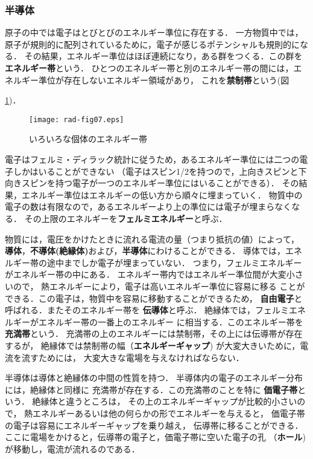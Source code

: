 \documentclass[a4j,10pt,oneside,openany]{jsbook}
\begin{document}
\subsubsection{半導体}

原子の中では電子はとびとびのエネルギー準位に存在する．
一方物質中では，原子が規則的に配列されているために，電子が感じるポテンシャルも規則的になる．
その結果，エネルギー準位はほぼ連続になり，ある群をつくる．この群を{\bf エネルギー帯}という．
ひとつのエネルギー帯と別のエネルギー帯の間には，エネルギー準位が存在しないエネルギー領域があり，
これを{\bf 禁制帯}という(図{\ref{fig:rad-fig07})．

\begin{figure}[h]
  \begin{center}
    \texttt{[image: rad-fig07.eps]}
    \caption{いろいろな個体のエネルギー帯}
    \label{fig:rad-fig07}
  \end{center}
\end{figure}


電子はフェルミ・ディラック統計に従うため，あるエネルギー準位には二つの電子しかはいることができない
（電子はスピン1/2を持つので，上向きスピンと下向きスピンを持つ電子が一つのエネルギー準位にはいることができる）．
その結果，エネルギー準位はエネルギーの低い方から順々に埋まっていく．
物質中の電子の数は有限なので，あるエネルギーより上の準位には電子が埋まらなくなる．
その上限のエネルギーを{\bf フェルミエネルギー}と呼ぶ．

物質には，電圧をかけたときに流れる電流の量（つまり抵抗の値）によって，
{\bf 導体}，{\bf 不導体(絶縁体)}および，{\bf 半導体}にわけることができる．
導体では，エネルギー帯の途中までしか電子が埋まっていない．
つまり，フェルミエネルギーがエネルギー帯の中にある．
エネルギー帯内ではエネルギー準位間が大変小さいので，
熱エネルギーにより，電子は高いエネルギー準位に容易に移る
ことができる．この電子は，物質中を容易に移動することができるため，
{\bf 自由電子}と呼ばれる．またそのエネルギー帯を
{\bf 伝導体}と呼ぶ．
絶縁体では，フェルミエネルギーがエネルギー帯の一番上のエネルギー
に相当する．このエネルギー帯を{\bf 充満帯}という．
充満帯の上のエネルギーには禁制帯，その上には伝導帯が存在するが，
絶縁体では禁制帯の幅（{\bf エネルギーギャップ})
が大変大きいために，電流を流すためには，
大変大きな電場を与えなければならない．

半導体は導体と絶縁体の中間の性質を持つ．
半導体内の電子のエネルギー分布には，絶縁体と同様に
充満帯が存在する．この充満帯のことを特に
{\bf 価電子帯}という．
絶縁体と違うところは，
その上のエネルギーギャップが比較的小さいので，
熱エネルギーあるいは他の何らかの形でエネルギーを与えると，
価電子帯の電子は容易にエネルギーギャップを乗り越え，
伝導帯に移ることができる．
ここに電場をかけると，伝導帯の電子と，価電子帯に空いた電子の孔
（{\bf ホール})が移動し，電流が流れるのである．

}
\end{document}
